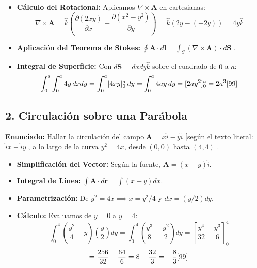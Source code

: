 \documentclass[a4paper]{article}
\begin{document}
\begin{itemize}
    \item \textbf{Cálculo del Rotacional:} Aplicamos $\nabla \times \mathbf{A}$ en cartesianas:
    \begin{equation*}
        \nabla \times \mathbf{A} = \hat{k} \left( \frac{\partial (2xy)}{\partial x} - \frac{\partial (x^2 - y^2)}{\partial y} \right) = \hat{k} (2y - (-2y)) = 4y\hat{k}
    \end{equation*}
    \item \textbf{Aplicación del Teorema de Stokes:} $\oint \mathbf{A} \cdot d\mathbf{l} = \int_S (\nabla \times \mathbf{A}) \cdot d\mathbf{S}$ \cite{97}.
    \item \textbf{Integral de Superficie:} Con $d\mathbf{S} = dx dy \hat{k}$ sobre el cuadrado de $0$ a $a$:
    \begin{equation*}
        \int_0^a \int_0^a 4y \, dx dy = \int_0^a [4xy]_0^a \, dy = \int_0^a 4ay \, dy = [2ay^2]_0^a = 2a^3 \text{\cite{99}}
    \end{equation*}
\end{itemize}

\subsection*{2. Circulación sobre una Parábola}
\textbf{Enunciado:} Hallar la circulación del campo $\mathbf{A} = x\hat{i} - y\hat{i}$ [según el texto literal: $\hat{i}x - \hat{i}y$], a lo largo de la curva $y^2 = 4x$, desde $(0, 0)$ hasta $(4, 4)$ \cite{99}.

\begin{itemize}
    \item \textbf{Simplificación del Vector:} Según la fuente, $\mathbf{A} = (x - y)\hat{i}$.
    \item \textbf{Integral de Línea:} $\int \mathbf{A} \cdot d\mathbf{r} = \int (x - y) dx$.
    \item \textbf{Parametrización:} De $y^2 = 4x \implies x = y^2/4$ y $dx = (y/2) dy$.
    \item \textbf{Cálculo:} Evaluamos de $y=0$ a $y=4$:
    \begin{equation*}
        \int_0^4 \left( \frac{y^2}{4} - y \right) \left( \frac{y}{2} \right) dy = \int_0^4 \left( \frac{y^3}{8} - \frac{y^2}{2} \right) dy = \left[ \frac{y^4}{32} - \frac{y^3}{6} \right]_0^4
    \end{equation*}
    \begin{equation*}
        = \frac{256}{32} - \frac{64}{6} = 8 - \frac{32}{3} = -\frac{8}{3} \text{\cite{99}}
    \end{equation*}
\end{itemize}
\end{document}
